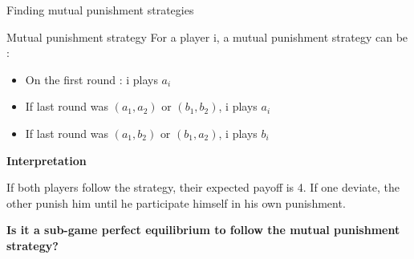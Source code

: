 \begin{frame}{Finding mutual punishment strategies}
    \begin{block}{Mutual punishment strategy}
        For a player i, a {\color{green}mutual punishment strategy} can be :
        \begin{itemize}
        	\item On the first round : i plays $a_i$ \pause
        	\item If last round was $(a_1,a_2) \text{ or } (b_1,b_2)$, i plays $a_i$ \pause
        	\item If last round was $(a_1,b_2) \text{ or } (b_1,a_2)$, i plays $b_i$
        \end{itemize}
    \end{block}
    \textbf{\color{green}Interpretation}
    
    If both players follow the strategy, their expected payoff is 4. If one deviate, the other punish him until he participate himself in his own punishment.
    
    \textbf{\color{green}Is it a sub-game perfect equilibrium to follow the mutual punishment strategy?}
    
\end{frame}

